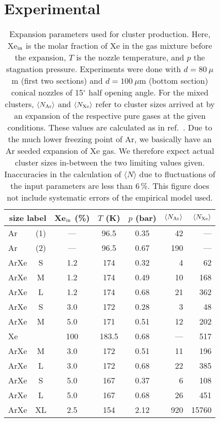 \section{Experimental}
%
\begin{table}
\caption{
Expansion parameters used for cluster production. Here, Xe$_{\rm in}$ is the molar fraction of Xe in the gas mixture before the expansion, $T$ is the nozzle temperature, and $p$ the stagnation pressure. Experiments were done with $d = 80~\mu$m (first two sections) and $d = 100~\mu$m (bottom section) conical nozzles of 15$^\circ$ half opening angle. For the mixed clusters, $\langle N_{\rm Ar} \rangle$ and $\langle N_{\rm Xe} \rangle$ refer to cluster sizes arrived at by an expansion of the respective pure gases at the given conditions. These values are calculated as in ref.\ \protect{}. Due to the much lower freezing point of Ar, we basically have an Ar seeded expansion of Xe gas. We therefore expect actual cluster sizes in-between the two limiting values given. Inaccuracies in the calculation of $\langle N\rangle$ due to fluctuations of the input parameters are less than 6\,\%. This figure does not include systematic errors of the empirical model used.
}
\label{tab:cluster}

\begin{tabular}{l c c c c r r}
%
\toprule
  \multicolumn{2}{r}{size label}  &  Xe$_{\rm in}$ (\%)  &  $T$ (K)  &  $p$ (bar) & $\langle N_{\rm Ar} \rangle$ & $\langle N_{\rm Xe} \rangle$ \\
%
\midrule
Ar & (1) & --- &  96.5  & 0.35  &  42  &  --- \\
Ar & (2) & --- &  96.5  & 0.67  & 190  &  --- \\
ArXe & S & 1.2 &  174   & 0.32  &   4  &   62 \\
ArXe & M & 1.2 &  174   & 0.49  &  10  &  168 \\
ArXe & L & 1.2 &  174   & 0.68  &  21  &  362 \\
ArXe & S & 3.0 &  172   & 0.28  &   3  &   48 \\
ArXe & M & 5.0 &  171   & 0.51  &  12  &  202 \\
Xe &  & 100 & 183.5  & 0.68  & ---  &  517 \\     
\midrule
ArXe & M & 3.0 &  172   & 0.51  &  11  &  196 \\
ArXe & L & 3.0 &  172   & 0.68  &  22  &  385 \\
ArXe & S  & 5.0 &  167   & 0.37  &   6  &  108 \\
ArXe & L  & 5.0 &  167   & 0.68  &  26  &  451 \\
\midrule
ArXe & XL & 2.5 &  154   & 2.12  &  920 & 15760\\
%
\bottomrule
\end{tabular}
\end{table}
